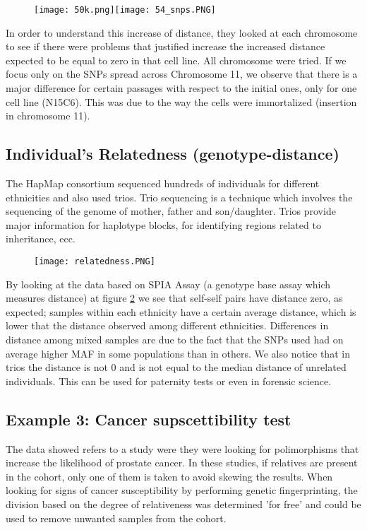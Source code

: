 \begin{figure}[H]
	\texttt{[image: 50k.png]}\quad\texttt{[image: 54\_snps.PNG]}
	\caption{\label{fig: cell_lines}}
\end{figure}

In order to understand this increase of distance, they looked at each chromosome to see if there were problems that justified increase the increased distance expected to be equal to zero in that cell line. All chromosome were tried. If we focus only on the SNPs spread across Chromosome 11, we observe that there is a major difference for certain passages with respect to the initial ones, only for one cell line (N15C6). This was due to the way the cells were immortalized (insertion in chromosome 11).


\subsection{Individual's Relatedness (genotype-distance)}

The HapMap consortium sequenced hundreds of individuals for different ethnicities and also used trios. Trio sequencing is a technique which involves the sequencing of the genome of mother, father and son/daughter. Trios provide major information for haplotype blocks, for identifying regions related to inheritance, ecc.

\begin{figure}[H]
	\texttt{[image: relatedness.PNG]}
	\caption{\label{fig: trios}}
\end{figure}

By looking at the data based on SPIA Assay (a genotype base assay which measures distance) at figure \ref*{fig: trios} we see that self-self pairs have distance zero, as expected; samples within each ethnicity have a certain average distance, which is lower that the distance observed among different ethnicities. Differences in distance among mixed samples are due to the fact that the SNPs used had on average higher MAF in some populations than in others. We also notice that in trios the distance is not 0 and is not equal to the median distance of unrelated individuals. This can be used for paternity tests or even in forensic science.

\subsection{Example 3: Cancer supscettibility test}
The data showed refers to a study were they were looking for polimorphisms that increase the likelihood of prostate cancer. In these studies, if relatives are present in the cohort, only one of them is taken to avoid skewing the results.
When looking for signs of cancer susceptibility by performing genetic fingerprinting, the division based on the degree of relativeness was determined 'for free' and could be used to remove unwanted samples from the cohort.


